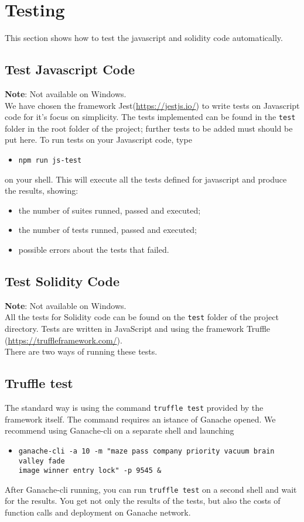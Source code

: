\section{Testing}
This section shows how to test the javascript and solidity code automatically.

\subsection{Test Javascript Code}
\textbf{Note}: Not available on Windows. \\
We have chosen the framework Jest(\url{https://jestjs.io/}) to write tests on Javascript code for it's focus on simplicity. 
The tests implemented can be found in the \texttt{test} folder in the root folder of the project; further tests to be added must should be put here.
To run tests on your Javascript code, type
\begin{itemize}
	\item[]\texttt{npm run js-test}
\end{itemize}
on your shell. 
This will execute all the tests defined for javascript and produce the results, showing:
\begin{itemize}
	\item the number of suites runned, passed and executed;
	\item the number of tests runned, passed and executed;
	\item possible errors about the tests that failed.
\end{itemize}

\subsection{Test Solidity Code}
\textbf{Note}: Not available on Windows. \\
All the tests for Solidity code can be found on the \texttt{test} folder of the project directory. Tests are written in JavaScript and using the framework Truffle (\url{https://truffleframework.com/}).\\
There are two ways of running these tests.
\subsection{Truffle test}
The standard way is using the command \texttt{truffle test} provided by the framework itself. The command requires an istance of Ganache opened. We recommend using Ganache-cli on a separate shell and launching 
\begin{itemize}
	\item[]\texttt{ganache-cli -a 10 -m "maze pass company priority vacuum brain valley fade\\ image winner entry lock"  -p 9545 \&}
\end{itemize}
After Ganache-cli running, you can run \texttt{truffle test} on a second shell and wait for the results. You get not only the results of the tests, but also the costs of function calls and deployment on Ganache network.

